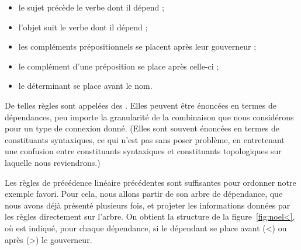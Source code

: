 \begin{itemize}
\item le sujet précède le verbe dont il dépend ;
\item l’objet suit le verbe dont il dépend ;
\item les compléments prépositionnels se placent après leur gouverneur ;
\item le complément d’une préposition se place après celle-ci ;
\item le déterminant se place avant le nom.
\end{itemize}

De telles règles sont appelées des . Elles peu\-vent être énoncées en termes de dépendances, peu importe la granularité de la combinaison que nous considérons pour un type de connexion donné. (Elles sont souvent énoncées en termes de constituants syntaxiques, ce qui n'est pas sans poser problème, en entretenant une confusion entre constituants syntaxiques et constituants topologiques sur laquelle nous reviendrons.)

Les règles de précédence linéaire précédentes sont suffisantes pour ordonner notre exemple favori. Pour cela, nous allons partir de son arbre de dépendance, que nous avons déjà présenté plusieurs fois, et projeter les informations données par les règles directement sur l'arbre. On obtient la structure de la figure~\ref{fig:noel<}, où est indiqué, pour chaque dépendance, si le dépendant se place avant (<) ou après (>) le gouverneur.


